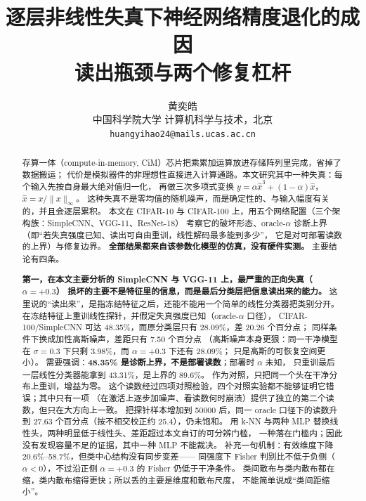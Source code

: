 \documentclass[11pt,a4paper]{ctexart}
\title{\bfseries 逐层非线性失真下神经网络精度退化的成因\\[2pt] 读出瓶颈与两个修复杠杆}
\author{黄奕皓\\[2pt] \small 中国科学院大学 计算机科学与技术，北京\\ \small \texttt{huangyihao24@mails.ucas.ac.cn}}
\date{}
\begin{document}
\maketitle

\vspace{-1.2em}
\begin{abstract}
\noindent
存算一体（compute-in-memory, CiM）芯片把乘累加运算放进存储阵列里完成，省掉了数据搬运；
代价是模拟器件的非理想性直接进入计算通路。本文研究其中一种失真：每个输入先按自身最大绝对值归一化，
再做三次多项式变换
$y=\alpha\hat{x}^3+(1-\alpha)\hat{x}$，$\hat{x}=x/\|x\|_\infty$。
这种失真不是零均值的随机噪声，而是确定性的、与输入幅度有关的，并且会逐层累积。
本文在 CIFAR-10 与 CIFAR-100 上，用五个网络配置（三个架构族：SimpleCNN、VGG-11、ResNet-18）
考察它的破坏形态、oracle-$\alpha$ 诊断上界（即“若失真强度已知、读出可自由重训，线性解码最多能到多少”，
它是对可部署读数的上界）与修复边界。
\textbf{全部结果都来自该参数化模型的仿真，没有硬件实测。}
主要结论有四条。

\textbf{第一，在本文主要分析的 SimpleCNN 与 VGG-11 上，最严重的正向失真（$\alpha=+0.3$）
损坏的主要不是特征里的信息，而是最后分类层把信息读出来的能力。}
这里说的“读出来”，是指冻结特征之后，还能不能用一个简单的线性分类器把类别分开。
在冻结特征上重训线性探针，并假定失真强度已知（oracle-$\alpha$ 口径），
CIFAR-100/SimpleCNN 可达 48.35\%，而原分类层只有 28.09\%，差 20.26 个百分点；
同样条件下换成加性高斯噪声，差距只有 7.50 个百分点
（高斯噪声本身更狠：同一干净模型在 $\sigma=0.3$ 下只剩 3.98\%，而 $\alpha=+0.3$ 下还有 28.09\%；
只是高斯的可恢复空间更小）。
需要强调：\textbf{48.35\% 是诊断上界，不是部署读数}；部署时 $\alpha$ 未知，
只重训最后一层线性分类器能拿到 43.31\%，是上界的 89.6\%。
作为对照，只把同一个头在干净分布上重训，增益为零。
这个读数经过四项对照检验，四个对照实验都不能够证明它错误；其中只有一项
（在激活上逐步加噪声、看读数何时崩溃）提供了独立的第二个读数，但只在大方向上一致。
把探针样本增加到 50000 后，同一 oracle 口径下的读数升到 27.63 个百分点（按不相交校正约 25.4），仍未饱和。
用 k-NN 与两种 MLP 替换线性头，两种明显低于线性头、差距超过本文自订的可分辨门槛，
一种落在门槛内；因此没有发现容量不足的证据，其中一种 MLP 不能裁决。
补充一句机制：有效维度下降 20.6\%--58.7\%，但类中心结构没有同步变差——
同强度下 Fisher 判别比不低于负侧（$\alpha<0$），不过沿正侧 $\alpha=+0.3$ 的 Fisher 仍低于干净条件。
类间散布与类内散布都在缩，类内散布缩得更快；所以丢的主要是维度和散布尺度，
不能简单说成“类间距缩小”。


\end{abstract}
\end{document}
